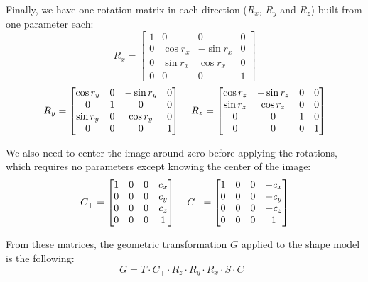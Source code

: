 Finally, we have one rotation matrix in each direction ($R_x$, $R_y$ and $R_z$) built from one parameter each:
\begin{equation*}
    R_x = 
    \begin{bmatrix}
        1 & 0 & 0 & 0 \\
        0 & \cos{r_x} & -\sin{r_x} & 0 \\
        0 & \sin{r_x} & \cos{r_x} & 0 \\ 
        0 & 0 & 0 & 1
    \end{bmatrix}
\end{equation*}
\begin{equation*}
    R_y = 
    \begin{bmatrix}
        \cos{r_y} & 0 & - \sin{r_y} & 0 \\
        0 & 1 & 0 & 0 \\
        \sin{r_y} & 0 & \cos{r_y} & 0 \\ 
        0 & 0 & 0 & 1
    \end{bmatrix}
    \mkern20mu
    R_z = 
    \begin{bmatrix}
        \cos{r_z} & -\sin{r_z} & 0 & 0 \\
        \sin{r_z} & \cos{r_z} & 0 & 0 \\
        0 & 0 & 1 & 0 \\ 
        0 & 0 & 0 & 1
    \end{bmatrix}
\end{equation*}

We also need to center the image around zero before applying the rotations, which requires no parameters except knowing the center of the image:
\begin{equation*}
    C_+ = 
    \begin{bmatrix}
        1 & 0 & 0 & c_x \\
        0 & 0 & 0 & c_y \\
        0 & 0 & 0 & c_z \\ 
        0 & 0 & 0 & 1
    \end{bmatrix}
    \mkern20mu
    C_- = 
    \begin{bmatrix}
        1 & 0 & 0 & -c_x \\
        0 & 0 & 0 & -c_y \\
        0 & 0 & 0 & -c_z \\ 
        0 & 0 & 0 & 1
    \end{bmatrix}
\end{equation*}

From these matrices, the geometric transformation $G$ applied to the shape model is the following:
\begin{equation}
    G = T \cdot C_+ \cdot R_z \cdot R_y \cdot R_x \cdot S \cdot C_-
\end{equation}

